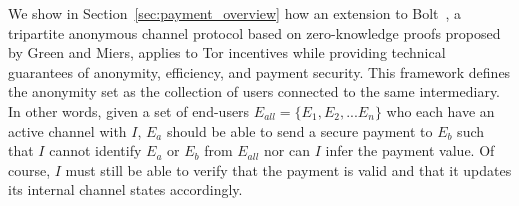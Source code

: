 We show in Section~\ref{sec:payment_overview} how an extension to Bolt~\cite{green2017bolt}, a tripartite anonymous channel protocol based on zero-knowledge proofs proposed by Green and Miers, applies to Tor incentives while providing technical guarantees of anonymity, efficiency, and payment security.
This framework defines the anonymity set as the collection of users connected to the same intermediary.
In other words, given a set of end-users $E_{all} = \{E_1, E_2, ...
E_n\}$ who each have an active channel with $I$, $E_a$ should be able to send a secure payment to $E_b$ such that $I$ cannot identify $E_a$ or $E_b$ from $E_{all}$ nor can $I$ infer the payment value.
Of course, $I$ must still be able to verify that the payment is valid and that it updates its internal channel states accordingly.


